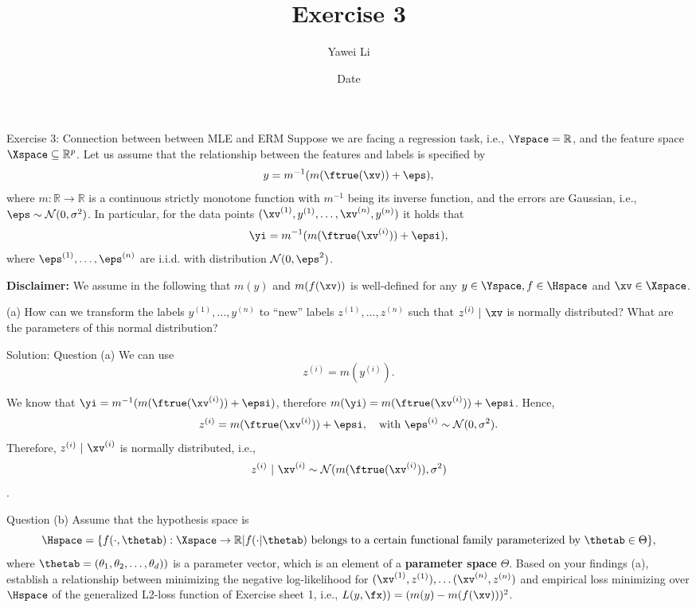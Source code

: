\documentclass[aspectratio=169]{beamer}
\title[]{\textbf{Exercise 3}}
\author{Yawei Li}
\institute[LMU]
{
\\
  \texttt{yawei.li@stat.uni-muenchen.de}
}
\date{Date}
\newcommand{\my}{m(y)}
\newcommand{\myi}{m(\yi)}
\newcommand{\mfx}{m(f(\xv))}
\newcommand{\zi}{z^{(i)}}
\newcommand{\mfruexi}{m(\ftrue(\xv^{(i)}))}
\begin{document}
\begin{frame}
\titlepage

\end{frame}


\begin{frame}{Exercise 3: Connection between between MLE and ERM}
\small
	Suppose we are facing a regression task, i.e., $\Yspace = \mathbb{R}$, and the feature space $\Xspace \subseteq \mathbb{R}^p$. Let us assume that the relationship between the features and labels is specified by 
	$$y = m^{-1}(m(\ftrue(\xv)) + \eps),$$
	where $m: \mathbb{R} \to \mathbb{R}$ is a continuous strictly monotone function with $m^{-1}$ being its inverse function, and the errors are Gaussian, i.e., $\eps \sim \mathcal{N}(0, \sigma^2)$. In particular, for the data points $(\xv^{(1)}, y^{(1)}, \ldots, \xv^{(n)}, y^{(n)})$ it holds that
	$$\yi = m^{-1}(m(\ftrue(\xv^{(i)})) + \epsi),$$
	where $\eps^{(1)}, \ldots, \eps^{(n)}$ are i.i.d. with distribution $\mathcal{N}(0, \eps^2)$.
	
	\textbf{Disclaimer:} We assume in the following that $\my$ and $\mfx$ is well-defined for any $y \in \Yspace, f \in \Hspace$ and $\xv \in \Xspace$.
	
	(a) How can we transform the labels $y^{(1)}, \ldots, y^{(n)}$ to ``new'' labels $z^{(1)}, \ldots, z^{(n)}$ such that $ z^{(i)} \ | \ \xv$ is normally distributed? What are the parameters of this normal distribution?
	
\end{frame}

\begin{frame}{Solution: Question (a)}
	We can use 
	$$z^{(i)} = m(y^{(i)}).$$

	We know that $ \yi = m^{-1}(\mfruexi + \epsi)$, therefore $	\myi = \mfruexi + \epsi$.
	Hence, 
	$$\zi = \mfruexi + \epsi, \quad \text{with } \eps^{(i)} \sim \mathcal{N}(0, \sigma^2). $$
	Therefore, $\zi \ | \ \xv^{(i)}$ is normally distributed, i.e., $$\zi \ | \ \xv^{(i)} \sim  \mathcal{N}(\mfruexi, \sigma^2)$$.

\end{frame}

\begin{frame}{Question (b)}
	Assume that the hypothesis space is 
	$$\Hspace = \{ f(\cdot, \thetab): \Xspace \to \mathbb{R} | f(\cdot | \thetab) \text{ belongs to a certain functional family parameterized by } \thetab \in \Theta \},$$
	where $\thetab = (\theta_1, \theta_2, \ldots, \theta_d))$ is a parameter vector, which is an element of a \textbf{parameter space} $\Theta$. Based on your findings (a), establish a relationship between minimizing the negative log-likelihood for $(\xv^{(1)}, z^{(1)}), 
	\ldots (\xv^{(n)}, z^{(n)})$ and empirical loss minimizing over $\Hspace$ of the generalized L2-loss function of Exercise sheet 1, i.e., $L(y, \fx)) = (\my - \mfx)^2$.
\end{frame}
\end{document}
